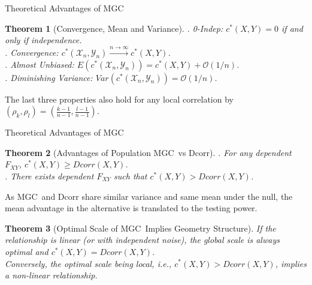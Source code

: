 \documentclass[mathserif,t]{beamer}
\newtheorem{thm}{Theorem}
\newcommand{\Mgc}{MGC}
\begin{document}
\begin{frame}{Theoretical Advantages of \Mgc}
\begin{thm}[Convergence, Mean and Variance]
. 0-Indep: $c^{*}(X,Y) =0$ if and only if independence.\\
\pause
{}. Convergence: $c^{*}(\mathcal{X}_{n},\mathcal{Y}_{n}) \stackrel{n \rightarrow \infty}{\rightarrow} c^{*}(X,Y)$.\\
\pause
{}. Almost Unbiased: $E(c^{*}(\mathcal{X}_{n},\mathcal{Y}_{n})) =c^{*}(X,Y)+\mathcal{O}(1/n)$.\\
\pause
{}. Diminishing Variance: $Var(c^{*}(\mathcal{X}_{n},\mathcal{Y}_{n})) =\mathcal{O}(1/n)$.\\
\end{thm}
\pause
\medskip
The last three properties also hold for any local correlation by $(\rho_{k},\rho_{l})=(\frac{k-1}{n-1},\frac{l-1}{n-1})$.
\end{frame}

\begin{frame}{Theoretical Advantages of \Mgc}
\begin{thm}[Advantages of Population \Mgc~vs Dcorr]
. For any dependent $F_{XY}$, $c^{*}(X,Y) \geq Dcorr(X,Y)$. \\
\pause
{}. There exists dependent $F_{XY}$ such that $c^{*}(X,Y)>Dcorr(X,Y)$.\\
\end{thm}
\pause
As \Mgc~and Dcorr share similar variance and same mean under the null, the mean advantage in the alternative is translated to the testing power. 
\pause
\begin{thm}[Optimal Scale of \Mgc~Implies Geometry Structure]
\pause
If the relationship is linear (or with independent noise), the global scale is always optimal and $c^{*}(X,Y)=Dcorr(X,Y)$.\\
\pause
\medskip
Conversely, the optimal scale being local, i.e., $c^{*}(X,Y)>Dcorr(X,Y)$, implies a non-linear relationship.
\end{thm}
\end{frame}
\end{document}
